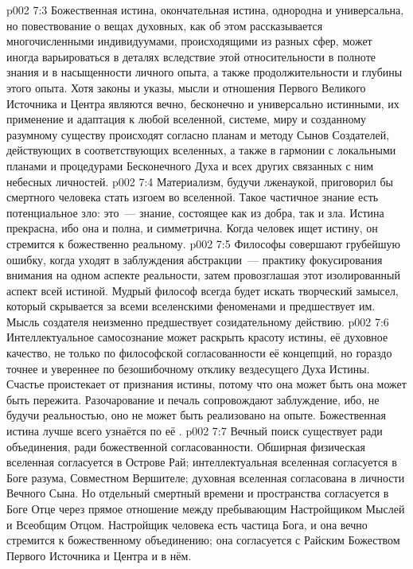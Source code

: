 \vs p002 7:3 Божественная истина, окончательная истина, однородна и универсальна, но повествование о вещах духовных, как об этом рассказывается многочисленными индивидуумами, происходящими из разных сфер, может иногда варьироваться в деталях вследствие этой относительности в полноте знания и в насыщенности личного опыта, а также продолжительности и глубины этого опыта. Хотя законы и указы, мысли и отношения Первого Великого Источника и Центра являются вечно, бесконечно и универсально истинными, их применение и адаптация к любой вселенной, системе, миру и созданному разумному существу происходят согласно планам и методу Сынов Создателей, действующих в соответствующих вселенных, а также в гармонии с локальными планами и процедурами Бесконечного Духа и всех других связанных с ним небесных личностей.
\vs p002 7:4 \pc Материализм, будучи лженаукой, приговорил бы смертного человека стать изгоем во вселенной. Такое частичное знание есть потенциальное зло: это~--- знание, состоящее как из добра, так и зла. Истина прекрасна, ибо она и полна, и симметрична. Когда человек ищет истину, он стремится к божественно реальному.
\vs p002 7:5 Философы совершают грубейшую ошибку, когда уходят в заблуждения абстракции~--- практику фокусирования внимания на одном аспекте реальности, затем провозглашая этот изолированный аспект всей истиной. Мудрый философ всегда будет искать творческий замысел, который скрывается за всеми вселенскими феноменами и предшествует им. Мысль создателя неизменно предшествует созидательному действию.
\vs p002 7:6 Интеллектуальное самосознание может раскрыть красоту истины, её духовное качество, не только по философской согласованности её концепций, но гораздо точнее и увереннее по безошибочному отклику вездесущего Духа Истины. Счастье проистекает от признания истины, потому что она может быть  она может быть пережита. Разочарование и печаль сопровождают заблуждение, ибо, не будучи реальностью, оно не может быть реализовано на опыте. Божественная истина лучше всего узнаётся по её .
\vs p002 7:7 \pc Вечный поиск существует ради объединения, ради божественной согласованности. Обширная физическая вселенная согласуется в Острове Рай; интеллектуальная вселенная согласуется в Боге разума, Совместном Вершителе; духовная вселенная согласована в личности Вечного Сына. Но отдельный смертный времени и пространства согласуется в Боге Отце через прямое отношение между пребывающим Настройщиком Мыслей и Всеобщим Отцом. Настройщик человека есть частица Бога, и она вечно стремится к божественному объединению; она согласуется с Райским Божеством Первого Источника и Центра и в нём.
